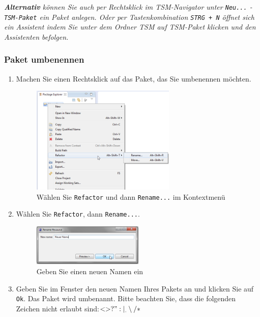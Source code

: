\documentclass[11pt,a4paper,titlepage]{article}
\begin{document}
\textit{\textbf{Alternativ} können Sie auch per Rechtsklick im TSM-Navigator unter \texttt{Neu...} - \texttt{TSM-Paket} ein Paket anlegen. Oder per  Tastenkombination \texttt{STRG + N} öffnet sich ein Assistent indem Sie unter dem Ordner TSM auf TSM-Paket klicken und den Assistenten befolgen.}

\subsubsection{Paket umbenennen}
\begin{enumerate}
\item Machen Sie einen Rechtsklick auf das Paket, das Sie umbenennen möchten.

\begin{figure}[H]
\centering
\includegraphics[width= 260px]{BilderHandbuch/UmbenennenR.png}
\caption{Wählen Sie \texttt{Refactor} und dann \texttt{Rename...} im Kontextmenü}
\label{fig:UmbenennenR}
\end{figure}

\item Wählen Sie \texttt{Refactor}, dann \texttt{Rename...}.

\begin{figure}[H]
\centering
\includegraphics[width= 200px]{BilderHandbuch/UmbenennenFenster.png}
\caption{Geben Sie einen neuen Namen ein}
\label{fig:UmbenennenFenster}
\end{figure}

\item Geben Sie im Fenster den neuen Namen Ihres Pakets an und klicken Sie auf \texttt{Ok}. Das Paket wird umbenannt. Bitte beachten Sie, dass die folgenden Zeichen nicht erlaubt sind:$ < > ? " : | _ . \setminus / *$
\end{enumerate}
\end{document}
